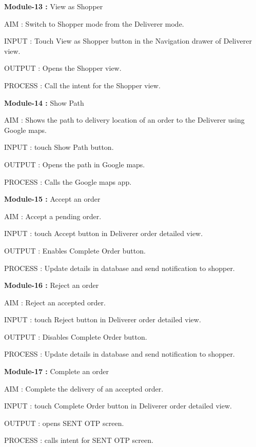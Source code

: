 \documentclass{report}
\begin{document}
\noindent \newline \textbf{Module-13 :} View as Shopper
\begin{description}
\item AIM : Switch to Shopper mode from the Deliverer mode.
\item INPUT : Touch View as Shopper button in the Navigation drawer of Deliverer view.
\item OUTPUT : Opens the Shopper view.
\item PROCESS : Call the intent for the Shopper view.
\end{description}

\noindent \newline \textbf{Module-14 :} Show Path
\begin{description}
\item AIM : Shows the path to delivery location of an order to the Deliverer using Google maps.
\item INPUT : touch Show Path button.
\item OUTPUT : Opens the path in Google maps.
\item PROCESS : Calls the Google maps app.
\end{description}

\noindent \newline \textbf{Module-15 :} Accept an order
\begin{description}
\item AIM : Accept a pending order.
\item INPUT : touch Accept button in Deliverer order detailed view.
\item OUTPUT : Enables Complete Order button.
\item PROCESS : Update details in database  and send notification to shopper.
\end{description}

\noindent \newline \textbf{Module-16 :} Reject an order
\begin{description}
\item AIM : Reject an accepted order.
\item INPUT : touch Reject button in Deliverer order detailed view.
\item OUTPUT : Disables Complete Order button.
\item PROCESS : Update details in database and send notification to shopper.
\end{description}

\noindent \newline \textbf{Module-17 :} Complete an order
\begin{description}
\item AIM : Complete the delivery of an accepted order.
\item INPUT : touch Complete Order button in Deliverer order detailed view.
\item OUTPUT : opens SENT OTP screen.
\item PROCESS : calls intent for SENT OTP screen.
\end{description}
\end{document}
